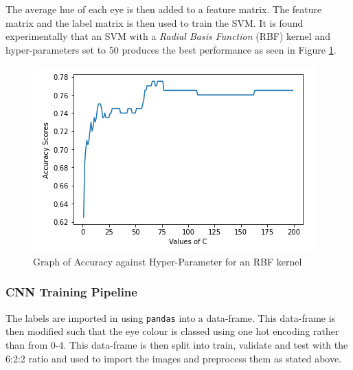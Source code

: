 \documentclass{article}
\begin{document}
	The average hue of each eye is then added to a feature matrix. The feature matrix and the label matrix is then used to train the SVM. It is found experimentally that an SVM with a \textit{Radial Basis Function} (RBF) kernel and hyper-parameters set to 50 produces the best performance as seen in Figure \ref{fig:B2_SVM}.
	\begin{figure}[htb]
		\centering
		\includegraphics[scale=0.7]{Figures/B2_SVM_C.PNG}
		\caption{Graph of Accuracy against Hyper-Parameter for an RBF kernel}
		\label{fig:B2_SVM}
	\end{figure}
	\subsubsection{CNN Training Pipeline}
	The labels are imported in using \verb|pandas| into a data-frame. This data-frame is then modified such that the eye colour is classed using one hot encoding rather than from 0-4. This data-frame is then split into train, validate and test with the 6:2:2 ratio and used to import the images and preprocess them as stated above.\\
	
\end{document}
